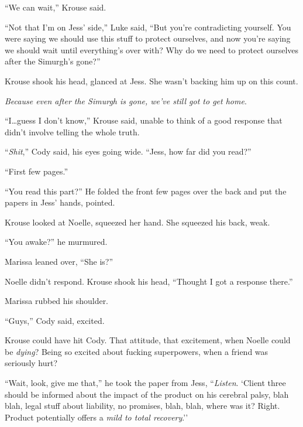 ``We can wait,'' Krouse said.



``Not that I'm on Jess' side,'' Luke said, ``But you're contradicting yourself.  You were saying we should use this stuff to protect ourselves, and now you're saying we should wait until everything's over with?  Why do we need to protect ourselves after the Simurgh's gone?''



Krouse shook his head, glanced at Jess.  She wasn't backing him up on this count.



\emph{Because even after the Simurgh is gone, we've still got to get home}.



``I\ldots guess I don't know,'' Krouse said, unable to think of a good response that didn't involve telling the whole truth.



``\emph{Shit},'' Cody said, his eyes going wide.  ``Jess, how far did you read?''



``First few pages.''



``You read this part?''  He folded the front few pages over the back and put the papers in Jess' hands, pointed.



Krouse looked at Noelle, squeezed her hand.  She squeezed his back, weak.



``You awake?'' he murmured.



Marissa leaned over, ``She is?''



Noelle didn't respond.  Krouse shook his head, ``Thought I got a response there.''



Marissa rubbed his shoulder.



``Guys,'' Cody said, excited.



Krouse could have hit Cody.  That attitude, that excitement, when Noelle could be \emph{dying}?  Being so excited about fucking superpowers, when a friend was seriously hurt?



``Wait, look, give me that,'' he took the paper from Jess, ``\emph{Listen}.  `Client three should be informed about the impact of the product on his cerebral palsy, blah blah, legal stuff about liability, no promises, blah, blah, where was it?  Right. Product potentially offers a \emph{mild to total recovery}.''



